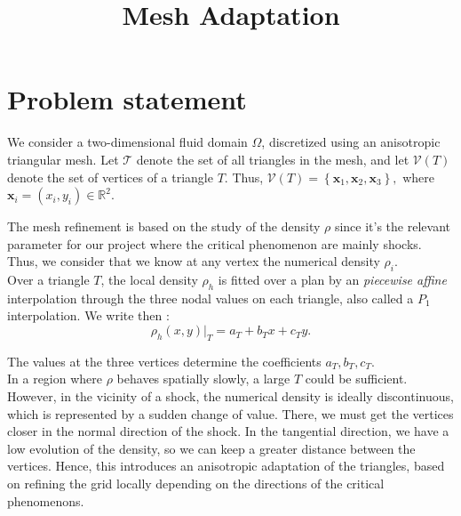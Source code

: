 \documentclass[11pt,a4paper]{article}
\title{Mesh Adaptation}
\author{}
\date{}
\begin{document}
\maketitle


\section{Problem statement}

\begin{minipage}[c]{0.65\textwidth}
    \raggedright
    We consider a two-dimensional fluid domain
    $\Omega$, discretized using an anisotropic
    triangular mesh.  Let $\mathcal{T}$ denote the set of all triangles in the mesh, and let $\mathcal{V}(T)$ denote
    the set of vertices of a triangle $T$. Thus,
    \(
        \mathcal{V}(T)
        = \left\{
            \mathbf{x}_1,
            \mathbf{x}_2,
            \mathbf{x}_3
          \right\},
    \)
    where
    \(
        \mathbf{x}_i = \left(x_i ,y_i\right)
        \in \mathbb{R}^2.
    \)

\end{minipage}
\hfill
\begin{minipage}[c]{0.32\textwidth}
    \centering

     \resizebox{\linewidth}{!}{%
    }

\end{minipage}


\noindent
The mesh refinement is based on the study of the density $\rho$ since it's the relevant parameter for our project where the critical phenomenon are mainly shocks. Thus, we consider that we know at any vertex the numerical density $\rho_i$. \\

\noindent
Over a triangle $T$, the local density $\rho_h$ is fitted over a plan by an \emph{piecewise affine} interpolation through the three nodal values on each triangle, also called a $P_1$ interpolation. We write then :
\begin{equation}
    \rho_h(x,y)\big|_T = a_T + b_T x + c_T y .
\end{equation}

\noindent
The values at the three vertices determine the coefficients \(a_T,b_T,c_T\). \\

\noindent
In a region where $\rho$ behaves spatially slowly, a large $T$ could be sufficient. However, in the vicinity of a shock, the numerical density is ideally discontinuous, which is represented by a sudden change of value. There, we must get the vertices closer in the normal direction of the shock. In the tangential direction, we have a low evolution of the density, so we can keep a greater distance between the vertices. Hence, this introduces an anisotropic adaptation of the triangles, based on refining the grid locally depending on the directions of the critical phenomenons.\\
\end{document}
